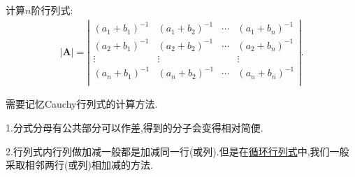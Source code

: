 \documentclass[../../main.tex]{subfiles}
\begin{document}
\begin{proposition}\label{Cauchy行列式}
计算$n$阶行列式:
\begin{gather}
|\boldsymbol{A}|=\left| \begin{matrix}
(a_1+b_1)^{-1}&		(a_1+b_2)^{-1}&		\cdots&		(a_1+b_n)^{-1}\\
(a_2+b_1)^{-1}&		(a_2+b_2)^{-1}&		\cdots&		(a_2+b_n)^{-1}\\
\vdots&		\vdots&		&		\vdots\\
(a_n+b_1)^{-1}&		(a_n+b_2)^{-1}&		\cdots&		(a_n+b_n)^{-1}\\
\end{matrix} \right|.
\nonumber
\end{gather}
\end{proposition}
\begin{note}
需要记忆Cauchy行列式的计算方法.

1.分式分母有公共部分可以作差,得到的分子会变得相对简便.

2.行列式内行列做加减一般都是加减同一行(或列).但是在\hyperlink{循环行列式}{循环行列式}中,我们一般采取相邻两行(或列)相加减的方法.
\end{note}
\end{document}
